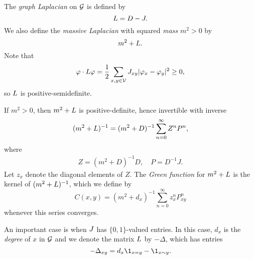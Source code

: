 The \emph{graph Laplacian} on $\mathcal{G}$ is defined by
\begin{equation}
L = D - J.
\end{equation}
We also define the \emph{massive Laplacian} with squared \emph{mass} $m^2 > 0$
by
\begin{equation}
m^2 + L.
\end{equation}
Note that
\begin{equation}
\varphi \cdot L \varphi
  =
\frac{1}{2} \sum_{x,y\in\mathcal{V}} J_{xy} |\varphi_x - \varphi_y|^2
  \ge
0,
\end{equation}
so $L$ is positive-semidefinite.

If $m^2 > 0$, then $m^2 + L$ is positive-definite, hence invertible with inverse
\begin{equation}
(m^2 + L)^{-1} = (m^2 + D)^{-1} \sum_{n=0}^\infty Z^n P^n,
\end{equation}
where
\begin{align}
Z = (m^2 + D)^{-1} D,
  \quad
P = D^{-1} J.
\end{align}
Let $z_x$ denote the diagonal elements of $Z$.
The \emph{Green function} for $m^2 + L$ is the kernel of $(m^2 + L)^{-1}$, which we define by
\begin{equation}
C(x, y)
  =
(m^2 + d_x)^{-1} \sum_{n=0}^\infty z_x^n P^n_{xy}
\end{equation}
whenever this series converges.

An important case is when $J$ has $\{0, 1 \}$-valued entries. In this case, $d_x$ is the
\emph{degree} of $x$ in $\mathcal{G}$ and we denote the matrix $L$ by $-\Delta$, which has
entries
\begin{equation}
-\Delta_{xy} = d_x \1_{x=y} - \1_{x \sim y}.
\end{equation}





